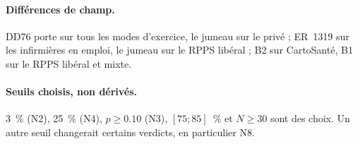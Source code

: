 \paragraph{Différences de champ.} DD76 porte sur tous les modes d'exercice, le jumeau sur le
privé ; ER~1319 sur les infirmières en emploi, le jumeau sur le RPPS libéral ; B2 sur CartoSanté,
B1 sur le RPPS libéral et mixte.

\paragraph{Seuils choisis, non dérivés.} 3\suppose{}~\% (N2), 25\suppose{}~\% (N4),
$p \ge \num{0.10}$\suppose{} (N3), $[75 ; 85]$\suppose{}~\% et $N \ge 30$\suppose{} sont des
choix. Un autre seuil changerait certains verdicts, en particulier N8.
\endgroup
